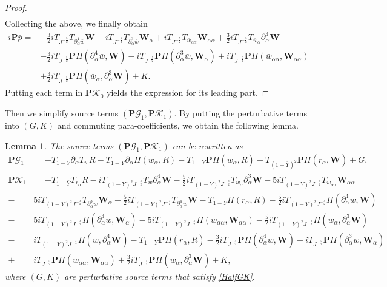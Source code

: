 \documentclass[10pt]{amsart}
\newtheorem{lemma}[theorem]{Lemma}
\theoremstyle{remark}
\theoremstyle{definition}
\numberwithin{equation}{section}
\newcommand{\p}{\partial}
\newcommand{\al}{\alpha}
\newcommand{\f}{\frac}
\newcommand{\bw}{\mathbf{W}}
\newcommand{\nP}{{\mathbf P}}
\begin{document}
\begin{proof}
\begin{equation*}
\begin{split}
\end{split}
\end{equation*}
Collecting the above, we finally obtain
\begin{align*}
i\nP\bar{p}=& -\f32 i T_{J^{-\f52}} T_{\p^4_{\al}\bar{w}}\bw - iT_{J^{-\f52}}T_{\p^3_{\al}\bar{w}}\bw_\al +iT_{J^{-\f52}} T_{\bar{w}_{\al\al}}\bw_{\al\al}+ \f32iT_{J^{-\f52}}T_{\bar{w}_{\al}} \p^3_{\al}\bw\\
&-\f32 iT_{J^{-\f52}} \nP \Pi(\p^4_{\al}\bar{w},\bw) - iT_{J^{-\f52}} \nP \Pi(\p^3_{\al}\bar{w}, \bw_\al)+ iT_{J^{-\f52}}\nP \Pi(\bar{w}_{\al\al},\bw_{\al\al})\\
&+ \f32 i T_{J^{-\f52}}\nP \Pi(\bar{w}_{\al},\p^3_{\al}\bw) +K.
\end{align*}
Putting each term in $\nP \mathcal{K}_0$ yields the expression for its leading part.
\end{proof}

Then we simplify source terms $(\nP\mathcal{G}_1, \nP\mathcal{K}_1)$.
By putting the perturbative terms into $(G,K)$ and commuting para-coefficients, we obtain the following lemma.
\begin{lemma} \label{t:PGKOneExp}
The source terms $(\nP\mathcal{G}_1, \nP\mathcal{K}_1)$ can be rewritten as
\begin{align*}
 \nP\mathcal{G}_1 &= -T_{1-\bar{Y}}\p_\al T_w R - T_{1-\bar{Y}}\p_\al\Pi(w_\al, R)- T_{1-Y}\nP\Pi(w_\al, \bar{R}) + T_{(1-\bar{Y})^2}\nP \Pi(r_\al, \bar{\bw}) +G,\\
  \nP\mathcal{K}_1 &= -T_{1-\bar{Y}}T_{r_{\al}}R -iT_{(1-Y)^2J^{-\f32}}T_{w}\p^4_{\al}\mathbf{W} -\f52iT_{(1-Y)^2J^{-\f32}}T_{w_{\al}}\p^3_{\al}\mathbf{W} -5iT_{(1-Y)^2J^{-\f32}}T_{w_{\al\al}} \mathbf{W}_{\al\al} \\
  -&5iT_{(1-Y)^2J^{-\f32}}T_{\p_{\al}^3w}\mathbf{W}_{\al} -\f52iT_{(1-Y)^2J^{-\f32}}T_{\p_{\al}^4w} \bw -T_{1-\bar{Y}}\Pi(r_{\al},R) -\f52iT_{(1-Y)^2J^{-\f32}}\Pi(\p_{\al}^4w, \bw) \\
  -&5iT_{(1-Y)^2J^{-\f32}}\Pi(\p^3_{\al}w,\mathbf{W}_{\al}) -5iT_{(1-Y)^2J^{-\f32}}\Pi(w_{\al\al},\mathbf{W}_{\al\al}) -\f52i T_{(1-Y)^2J^{-\f32}}\Pi(w_{\al},\p^3_{\al}\mathbf{W})\\
  -&iT_{(1-Y)^2J^{-\f32}}\Pi(w,\p^4_{\al}\mathbf{W}) -T_{1-Y}\nP\Pi(r_{\al},\bar{R})-\f32i  T_{J^{-\f52}} \nP\Pi(\p^4_{\al}w,\bar{\bw})-iT_{J^{-\f52}}\nP\Pi(\p^3_{\al}w,\bar{\bw}_{\al})\\
  +&iT_{J^{-\f52}}\nP\Pi(w_{\al\al},\bar{\mathbf{W}}_{\al\al})+\f32iT_{J^{-\f52}}\nP\Pi(w_{\al},\p^3_{\al}\bar{\mathbf{W}}) + K,
 \end{align*}
where $(G,K)$ are perturbative source terms that satisfy \eqref{HalfGK}.
\end{lemma}
\end{document}
